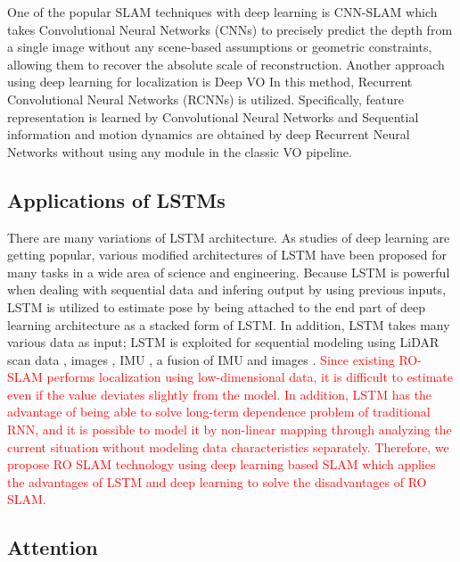 \documentclass{ieeeaccess}
\begin{document}
One of the popular SLAM techniques with deep learning is CNN-SLAM \cite{tateno2017cnn} which takes Convolutional Neural Networks (CNNs) to precisely predict the depth from a single image without any scene-based assumptions or geometric constraints, allowing them to recover the absolute scale of reconstruction. Another approach using deep learning for localization is Deep VO \cite{clark2017vinet} In this method, Recurrent Convolutional Neural Networks (RCNNs) is utilized. Specifically, feature representation is learned by Convolutional Neural Networks and Sequential information and motion dynamics are obtained by deep Recurrent Neural Networks without using any module in the classic VO pipeline.


\subsection{Applications of LSTMs}

There are many variations of LSTM architecture. As studies of deep learning are getting popular, various modified architectures of LSTM have been proposed for many tasks in a wide area of science and engineering. Because LSTM is powerful when dealing with sequential data and infering output by using previous inputs, LSTM is utilized to estimate pose by being attached to the end part of deep learning architecture \cite{wang2017deepvo, kendall2015posenet, turan2018deep}  as a stacked form of LSTM. In addition, LSTM takes many various data as input; LSTM is exploited for sequential modeling using LiDAR scan data \cite{gladh2016deep}, images \cite{walch2017image, wang2017deepvo}, IMU \cite{ordonez2016deep}, a fusion of IMU and images \cite{clark2017vinet}. \textcolor{red}{Since existing RO-SLAM performs localization using low-dimensional data, it is difficult to estimate even if the value deviates slightly from the model. In addition, LSTM has the advantage of being able to solve long-term dependence problem of traditional RNN, and it is possible to model it by non-linear mapping through analyzing the current situation without modeling data characteristics separately. Therefore, we propose RO SLAM technology using deep learning based SLAM which applies the advantages of LSTM and deep learning to solve the disadvantages of RO SLAM.}



\subsection{Attention}
\end{document}
